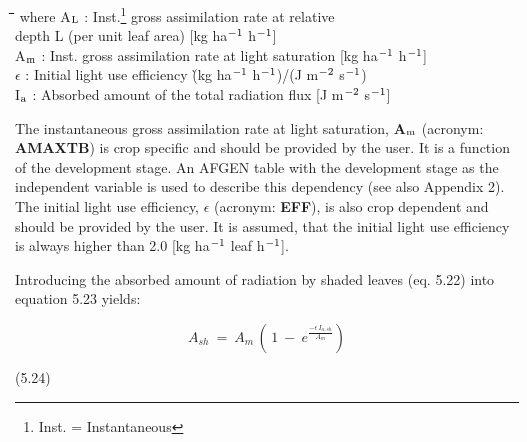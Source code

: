 \nwln
\begin{tabbing}
\hspace{1.27cm}\=\hspace{1.27cm}\=\hspace{1.27cm}\=\hspace{1.27cm}\=%
\hspace{1.27cm}\=\hspace{1.27cm}\=\hspace{1.27cm}\=\hspace{1.27cm}\=%
\hspace{1.27cm}\=\hspace{1.27cm}\=\kill
where A$_{{\rm L}}$ : Inst.\footnote{ Inst. = Instantaneous} gross assimilation rate at relative\\
   depth L (per unit leaf area)        [kg ha$^{{\rm -1}}$ h$^{{\rm -1}}$]\\
A$_{{\rm m}}$ : Inst. gross assimilation rate at light saturation        [kg ha$^{{\rm -1}}$ h$^{{\rm -1}}$]\\
$\epsilon$ : Initial light use efficiency      \`(kg ha$^{{\rm -1}}$ h$^{{\rm -1}}$)/(J m$^{{\rm -2}}$ s$^{{\rm -1}}$)\\
I$_{{\rm a}}$ : Absorbed amount of the total radiation flux        [J m$^{{\rm -2}}$ s$^{{\rm -1}}$]
\end{tabbing}



The instantaneous gross assimilation rate at light saturation, {\bf A$_{{\rm m}}$} (acronym: {\bf AMAXTB}) is
crop specific and should be provided by the user. It is a function of the development
stage. An AFGEN table with the development stage as the independent variable is used to
describe this dependency (see also Appendix 2). The initial light use efficiency, {\bf $\epsilon$}
(acronym: {\bf EFF}), is also crop dependent and should be provided by the user. It is
assumed, that the initial light use efficiency is always higher than 2.0 [kg ha$^{{\rm -1}}$ leaf h$^{{\rm -1}}$]. 



Introducing the absorbed amount of radiation by shaded leaves (eq. 5.22) into equation
5.23 yields:

\begin{displaymath}
A _{sh} ~=~ A _{m} \, (\, 1~-~ e ^{{\frac{ - \epsilon\, I _{a,sh} }{ A _{m} }} } )
\end{displaymath}

 
\strut\hfill (5.24)

